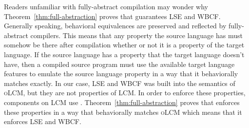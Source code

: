 \documentclass[acmsmall,review,anonymous]{acmart}\settopmatter{printfolios=true,printccs=false,printacmref=false}
\newcommand{\trgcm}{\textsc{LCM}}
\newcommand{\srccm}{\textsc{oLCM}}
\begin{document}
Readers unfamiliar with fully-abstract compilation may wonder why Theorem~\ref{thm:full-abstraction} proves that \stktokens{} guarantees LSE and WBCF.
Generally speaking, behavioral equivalences are preserved and reflected by fully-abstract compilers.
This means that any property the source language has must somehow be there after compilation whether or not it is a property of the target language.
If the source language has a property that the target language doesn't have, then a compiled source program must use the available target language features to emulate the source language property in a way that it behaviorally matches exactly.
In our case, LSE and WBCF was built into the semantics of \srccm{}, but they are not properties of \trgcm{}.
In order to enforce these properties, components on \trgcm{} use \stktokens{}.
Theorem~\ref{thm:full-abstraction} proves that \stktokens{} enforces these properties in a way that behaviorally matches \srccm{} which means that it enforces LSE and WBCF.



\end{document}
